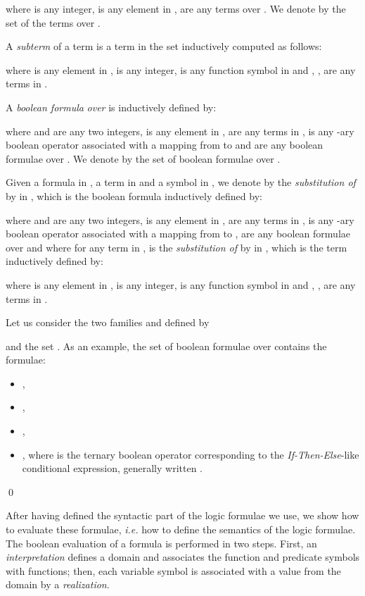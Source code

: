 \documentclass[a4paper]{llncs}
\begin{document}
  where  is any integer,  is any element in ,  are any  terms over . 
    We denote by  the set of the terms over .
    
    A \emph{subterm} of a term  is a term in the set  inductively computed as follows:
  
  where  is any element in ,  is any integer,  is any function symbol in  and , ,  are any  terms in .
     
    A \emph{boolean formula}  \emph{over}  is inductively defined by:
  
  where  and  are any two integers,  is any element in ,  are any  terms in ,  is any
    -ary boolean operator associated with a mapping from  to 
  and  are any  boolean formulae over . We denote by  the set of boolean formulae over .
  
  Given a formula  in , a term  in  and a symbol  in , we denote by  the \emph{substitution of}  by  in , which is the boolean formula inductively defined by:
  
  where  and  are any two integers,  is any element in ,  are any  terms in ,  is any
    -ary boolean operator associated with a mapping from  to ,  are any  boolean formulae over  and where for any term  in ,  is the \emph{substitution of}  by  in , which is the term inductively defined by:
  
  where  is any element in ,  is any integer,  is any function symbol in  and , ,  are any  terms in .
  
  \begin{example}\label{ex formule bool}
    Let us consider the two families  and  defined by
  
  and the set .        
        As an example, the set of boolean formulae over  contains the formulae:
    \begin{itemize}
      \item ,
      \item ,
      \item ,
      \item , where  is the ternary  boolean operator corresponding to the \emph{If-Then-Else}-like conditional expression, generally written .
    \end{itemize}
    \qed
  \end{example}
  
  After having defined the syntactic part of the logic formulae we use, we show how to evaluate these formulae, \emph{i.e.} how to define the semantics of the logic formulae. The boolean evaluation of a formula is performed in two steps. First, an \emph{interpretation} defines a domain and associates the function and predicate symbols with functions; then, each variable symbol is associated with a value from the domain by a \emph{realization}. 
  
\end{document}
